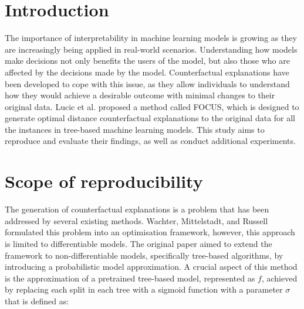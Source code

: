 \section{Introduction}
\label{sec:intro}
The importance of interpretability in machine learning models is growing as they are increasingly being applied in real-world scenarios. Understanding how models make decisions not only benefits the users of the model, but also those who are affected by the decisions made by the model. Counterfactual explanations have been developed to cope with this issue, as they allow individuals to understand how they would achieve a desirable outcome with minimal changes to their original data. Lucic et al.\cite{lucic2022focus} proposed a method called FOCUS, which is designed to generate optimal distance counterfactual explanations to the original data for all the instances in tree-based machine learning models. This study aims to reproduce and evaluate their findings, as well as conduct additional experiments.

\section{Scope of reproducibility}
\label{sec:claims}
The generation of counterfactual explanations is a problem that has been addressed by several existing methods. Wachter, Mittelstadt, and Russell \cite{wachter2017counterfactual} formulated this problem into an optimisation framework, however, this approach is limited to differentiable models. The original paper aimed to extend the framework to non-differentiable models, specifically tree-based algorithms, by introducing a probabilistic model approximation. A crucial aspect of this method is the approximation of a pretrained tree-based model, represented as $f$, achieved by replacing each split in each tree with a sigmoid function with a parameter $\sigma$ that is defined as:

